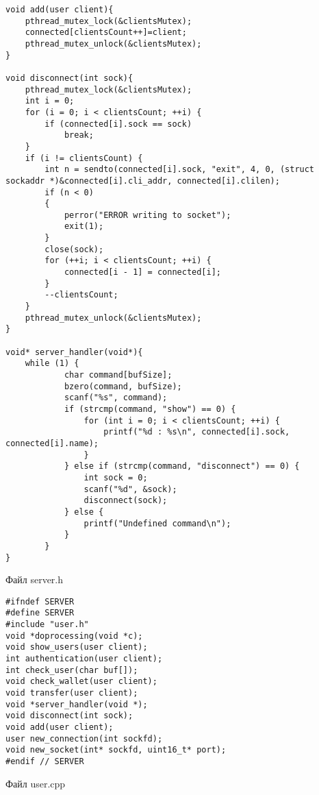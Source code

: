 \documentclass[12pt,a4paper]{report}
\begin{document}
\begin{lstlisting}
void add(user client){
    pthread_mutex_lock(&clientsMutex);
    connected[clientsCount++]=client;
    pthread_mutex_unlock(&clientsMutex);
}

void disconnect(int sock){
    pthread_mutex_lock(&clientsMutex);
    int i = 0;
    for (i = 0; i < clientsCount; ++i) {
        if (connected[i].sock == sock)
            break;
    }
    if (i != clientsCount) {
        int n = sendto(connected[i].sock, "exit", 4, 0, (struct sockaddr *)&connected[i].cli_addr, connected[i].clilen);
        if (n < 0)
        {
            perror("ERROR writing to socket");
            exit(1);
        }
        close(sock);
        for (++i; i < clientsCount; ++i) {
            connected[i - 1] = connected[i];
        }
        --clientsCount;
    }
    pthread_mutex_unlock(&clientsMutex);
}

void* server_handler(void*){
    while (1) {
            char command[bufSize];
            bzero(command, bufSize);
            scanf("%s", command);
            if (strcmp(command, "show") == 0) {
                for (int i = 0; i < clientsCount; ++i) {
                    printf("%d : %s\n", connected[i].sock, connected[i].name);
                }
            } else if (strcmp(command, "disconnect") == 0) {
                int sock = 0;
                scanf("%d", &sock);
                disconnect(sock);
            } else {
                printf("Undefined command\n");
            }
        }
}
\end{lstlisting}
Файл server.h
\begin{lstlisting}
#ifndef SERVER
#define SERVER
#include "user.h"
void *doprocessing(void *c);
void show_users(user client);
int authentication(user client);
int check_user(char buf[]);
void check_wallet(user client);
void transfer(user client);
void *server_handler(void *);
void disconnect(int sock);
void add(user client);
user new_connection(int sockfd);
void new_socket(int* sockfd, uint16_t* port);
#endif // SERVER
\end{lstlisting}
Файл user.cpp
\end{document}
